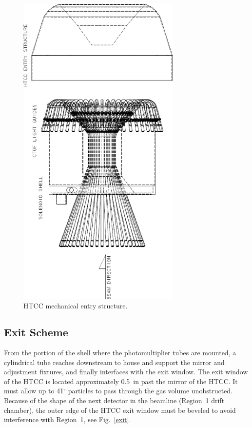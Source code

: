 \begin{figure}[h]
\begin{centering}
\includegraphics[height=16.0cm,angle=270]{Mechanical/CD3_Cyril_7.eps}
\hspace{0.1cm}
\caption{\small{HTCC mechanical entry structure.}}
\label{entry}
\end{centering}
\end{figure}

\subsection{Exit Scheme}

From the portion of the shell where the photomultiplier tubes are mounted, 
a cylindrical tube reaches downstream to house and support the mirror and 
adjustment fixtures, and finally interfaces with the exit window.  The 
exit window of the HTCC is located approximately 0.5~in past the mirror of 
the HTCC. It must allow up to 41$^\circ$ particles to pass through the gas 
volume unobstructed.  Because of the shape of the next detector in the 
beamline (Region~1 drift chamber), the outer edge of the HTCC exit window 
must be beveled to avoid interference with Region~1, see Fig.~\ref{exit}.

